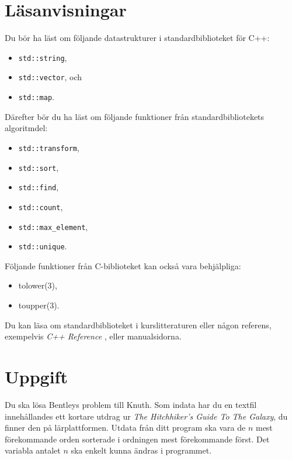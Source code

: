 \documentclass[a4paper]{miunasgn}
\begin{document}
\section{Läsanvisningar}
\label{sec:Prerequisites}
\noindent
Du bör ha läst om följande datastrukturer i standardbiblioteket för C++:
\begin{itemize}
	\item \texttt{std::string},
	\item \texttt{std::vector}, och
	\item \texttt{std::map}.
\end{itemize}
Därefter bör du ha läst om följande funktioner från standardbibliotekets 
algoritmdel:
\begin{itemize}
	\item \texttt{std::transform},
	\item \texttt{std::sort},
	\item \texttt{std::find},
	\item \texttt{std::count},
	\item \texttt{std::max\_element},
	\item \texttt{std::unique}.
\end{itemize}
Följande funktioner från C-biblioteket kan också vara behjälpliga:
\begin{itemize}
	\item tolower(3),
	\item toupper(3).
\end{itemize}

Du kan läsa om standardbiblioteket i kurslitteraturen \cite{Deitel2012cht} 
eller någon referens, exempelvis \emph{C++ Reference} \cite{cppref}, eller 
manualsidorna.


\section{Uppgift}
\label{sec:Tasks}
\noindent
Du ska lösa Bentleys problem till Knuth.
Som indata har du en textfil innehållandes ett kortare utdrag ur \emph{The 
Hitchhiker's Guide To The Galaxy}, du finner den på lärplattformen.
Utdata från ditt program ska vara de \(n\) mest förekommande orden sorterade 
i ordningen mest förekommande först.
Det variabla antalet \(n\) ska enkelt kunna ändras i programmet.






\end{document}
